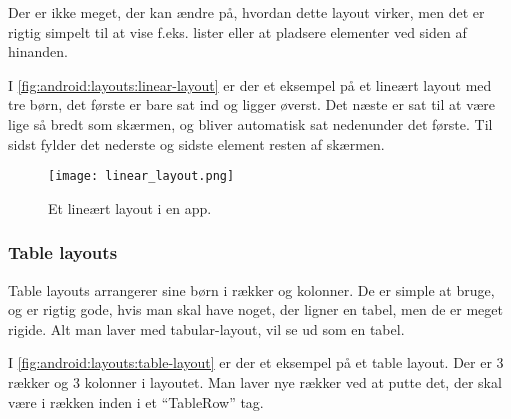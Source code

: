 Der er ikke meget, der kan ændre på, hvordan dette layout virker, men det er 
rigtig simpelt til at vise f.eks. lister eller at pladsere elementer ved siden 
af hinanden.

I \autoref{fig:android:layouts:linear-layout} er der et eksempel på et lineært 
layout med tre børn, det første er bare sat ind og ligger øverst. Det næste er 
sat til at være lige så bredt som skærmen, og bliver automatisk sat nedenunder 
det første. Til sidst fylder det nederste og sidste element resten af skærmen.

\begin{figure}[h]
	\begin{center}
		\texttt{[image: linear\_layout.png]}
		\caption{Et lineært layout i en app.}
		\label{fig:android:layouts:linear-layout}
	\end{center}
\end{figure}


\clearpage

\FloatBarrier
\subsubsection{Table layouts}
Table layouts arrangerer sine børn i rækker og kolonner. De er simple at 
bruge, og er rigtig gode, hvis man skal have noget, der ligner en tabel, men de er 
meget rigide. Alt man laver med tabular-layout, vil se ud som en tabel.
 
I \autoref{fig:android:layouts:table-layout} er der et eksempel på et table 
layout. Der er 3 rækker og 3 kolonner i layoutet. Man laver nye rækker ved at 
putte det, der skal være i rækken inden i et ``TableRow'' tag.
 
